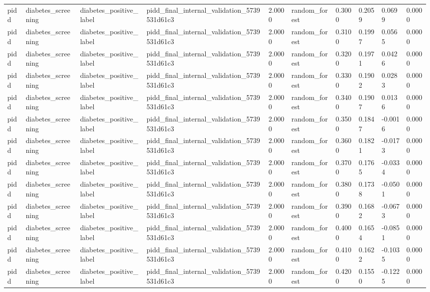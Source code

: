 \begin{tabular}{llllllllll}
pidd & diabetes\_screening & diabetes\_positive\_label & pidd\_final\_internal\_validation\_5739531d61c3 & 2.0000 & random\_forest & 0.3000 & 0.2059 & 0.0699 & 0.0000 \\
pidd & diabetes\_screening & diabetes\_positive\_label & pidd\_final\_internal\_validation\_5739531d61c3 & 2.0000 & random\_forest & 0.3100 & 0.1997 & 0.0565 & 0.0000 \\
pidd & diabetes\_screening & diabetes\_positive\_label & pidd\_final\_internal\_validation\_5739531d61c3 & 2.0000 & random\_forest & 0.3200 & 0.1971 & 0.0426 & 0.0000 \\
pidd & diabetes\_screening & diabetes\_positive\_label & pidd\_final\_internal\_validation\_5739531d61c3 & 2.0000 & random\_forest & 0.3300 & 0.1902 & 0.0283 & 0.0000 \\
pidd & diabetes\_screening & diabetes\_positive\_label & pidd\_final\_internal\_validation\_5739531d61c3 & 2.0000 & random\_forest & 0.3400 & 0.1907 & 0.0136 & 0.0000 \\
pidd & diabetes\_screening & diabetes\_positive\_label & pidd\_final\_internal\_validation\_5739531d61c3 & 2.0000 & random\_forest & 0.3500 & 0.1847 & -0.0016 & 0.0000 \\
pidd & diabetes\_screening & diabetes\_positive\_label & pidd\_final\_internal\_validation\_5739531d61c3 & 2.0000 & random\_forest & 0.3600 & 0.1821 & -0.0173 & 0.0000 \\
pidd & diabetes\_screening & diabetes\_positive\_label & pidd\_final\_internal\_validation\_5739531d61c3 & 2.0000 & random\_forest & 0.3700 & 0.1765 & -0.0334 & 0.0000 \\
pidd & diabetes\_screening & diabetes\_positive\_label & pidd\_final\_internal\_validation\_5739531d61c3 & 2.0000 & random\_forest & 0.3800 & 0.1738 & -0.0501 & 0.0000 \\
pidd & diabetes\_screening & diabetes\_positive\_label & pidd\_final\_internal\_validation\_5739531d61c3 & 2.0000 & random\_forest & 0.3900 & 0.1682 & -0.0673 & 0.0000 \\
pidd & diabetes\_screening & diabetes\_positive\_label & pidd\_final\_internal\_validation\_5739531d61c3 & 2.0000 & random\_forest & 0.4000 & 0.1654 & -0.0851 & 0.0000 \\
pidd & diabetes\_screening & diabetes\_positive\_label & pidd\_final\_internal\_validation\_5739531d61c3 & 2.0000 & random\_forest & 0.4100 & 0.1622 & -0.1035 & 0.0000 \\
pidd & diabetes\_screening & diabetes\_positive\_label & pidd\_final\_internal\_validation\_5739531d61c3 & 2.0000 & random\_forest & 0.4200 & 0.1550 & -0.1225 & 0.0000 \\

\end{tabular}
